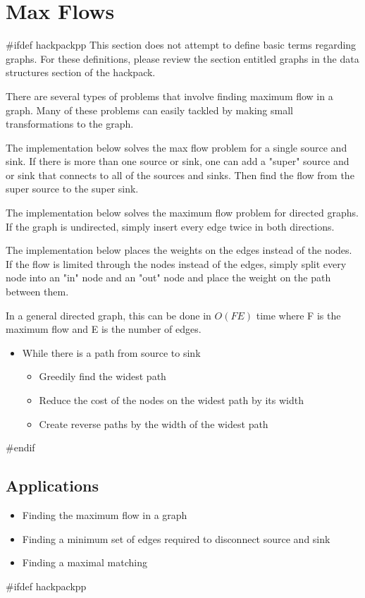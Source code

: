 \section{Max Flows}
#ifdef hackpackpp
This section does not attempt to define basic terms regarding graphs.
For these definitions, please review the section entitled graphs in the data structures section of the hackpack.


There are several types of problems that involve finding maximum flow in a graph.
Many of these problems can easily tackled by making small transformations to the graph.


The implementation below solves the max flow problem for a single source and sink.
If there is more than one source or sink, one can add a "super" source and or sink that connects to all of the sources and sinks.
Then find the flow from the super source to the super sink.


The implementation below solves the maximum flow problem for directed graphs.
If the graph is undirected, simply insert every edge twice in both directions.


The implementation below places the weights on the edges instead of the nodes.
If the flow is limited through the nodes instead of the edges, simply split every node into an "in" node and an "out" node and place the weight on the path between them.


In a general directed graph, this can be done in $O(FE)$ time where F is the maximum flow and E is the number of edges.
\begin{itemize}
	\item While there is a path from source to sink
	\begin{itemize}
		\item Greedily find the widest path
		\item Reduce the cost of the nodes on the widest path by its width
		\item Create reverse paths by the width of the widest path
	\end{itemize}
\end{itemize}

#endif

\subsection{Applications}
\begin{itemize}
	\item Finding the maximum flow in a graph
	\item Finding a minimum set of edges required to disconnect source and sink
	\item Finding a maximal matching
\end{itemize}
#ifdef hackpackpp

